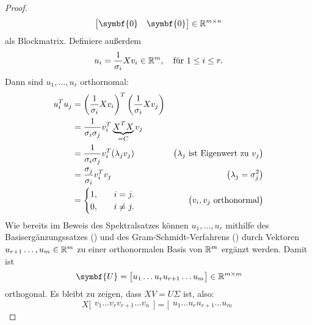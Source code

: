 \begin{proof}
\begin{alignat*}{2}
\begin{bmatrix}
            \symbf{0} & \symbf{0}
        \end{bmatrix}
        \in \R^{m \times n}
    \end{alignat*}
    als Blockmatrix.
    Definiere außerdem
    \begin{equation*}
        u_i = \frac{1}{\sigma_i}Xv_i \in \mathbb{R}^{m}, \quad \text{für } 1 \leq i \leq r.
    \end{equation*}
    Dann sind \(u_1,\ldots,u_r\) orthornomal:
    \begin{align*}
        u_i^{T}u_j &= {\left(\frac{1}{\sigma_i}Xv_i\right)}^{T}\left(\frac{1}{\sigma_i}Xv_j\right) \\
        &= \frac{1}{\sigma_i \sigma_j}v_i^{T}\underbrace{X^{\raisebox{0.2ex}{\(\scriptstyle{T}\)}}X}_{=C}v_j \\
        &= \frac{1}{\sigma_i\sigma_j}v_i^{T}(\lambda_j v_j) & \bigl(\lambda_j \text{ ist Eigenwert zu } v_j \bigr) \\
        &= \frac{\sigma_j}{\sigma_i}v_i^{T}v_j & \bigl(\lambda_j = \sigma_j^{2}\bigr) \\
        &=
        \begin{cases}
            1, \quad & i=j. \\
            0, \quad & i \neq j.
        \end{cases} & \bigl(v_i,v_j \text{ orthonormal}\bigr)
    \end{align*}
    Wie bereits im Beweis des Spektralsatzes können \(u_1,\ldots,u_r\) mithilfe des Basisergänzungssatzes () und des Gram-Schmidt-Verfahrens () durch Vektoren \(u_{r+1}\ldots,u_m \in \mathbb{R}^{m}\) zu einer orthonormalen Basis von \(\mathbb{R}^{m}\) ergänzt werden. 
    \enlargethispage{\baselineskip} 
    Damit ist 
    \begin{equation*}
        \symbf{U} =
        \big[
        \begin{matrix}
            u_1 \dots u_{r}u_{r+1} \dots u_m
        \end{matrix}
        \big]
        \in \R^{m \times m}
    \end{equation*}
    orthogonal.   
    Es bleibt zu  zeigen, dass \(XV = U\Sigma\) ist, also:
    \begin{equation*}
        X
        \big[
        \begin{matrix}
            v_1 \dots v_{r}v_{r+1} \dots v_n
        \end{matrix}
        \big]
        =
        \big[
        \begin{matrix}
            u_1 \dots u_{r}u_{r+1} \dots u_m

\end{matrix}
\end{equation*}
\end{proof}
